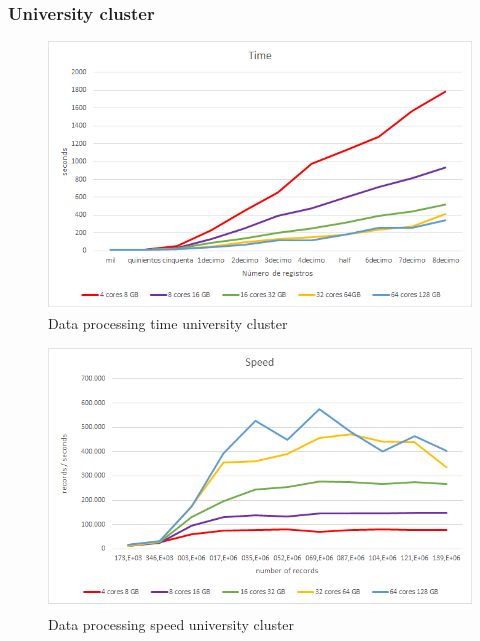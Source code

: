 \subsubsection{University cluster}
\begin{figure}[htp!]
	\centering
	\caption{Data processing time university cluster}
	\label{tpu}
	\vspace{5pt}
	\includegraphics[scale=0.8]{geng/tpu}
\end{figure}
\begin{figure}[htp!]
	\centering
	\caption{Data processing speed university cluster}
	\label{spu}
	\vspace{5pt}
	\includegraphics[scale=0.85]{geng/spu}
\end{figure}
